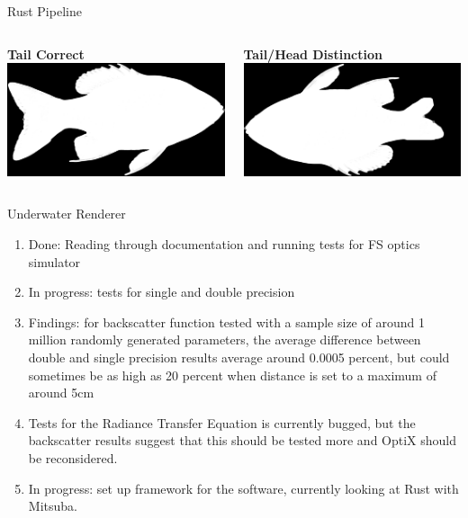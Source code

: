 \begin{frame}{Rust Pipeline}
    \begin{columns}[c]
          \centering
          \textbf{Tail Correct}\\[1ex]
          \includegraphics[height=0.48\textheight,keepaspectratio]{./images/picture1.png}
    
          \centering
          \textbf{Tail/Head Distinction}\\[1ex]
          \includegraphics[height=0.48\textheight,keepaspectratio]{./images/picture2.png}
    \end{columns}
\end{frame}

\begin{frame}{Underwater Renderer}
    \begin{enumerate}
	    \item Done: Reading through documentation and running tests for FS optics simulator
	    \item In progress: tests for single and double precision
     	    \item Findings: for backscatter function tested with a sample size of around 1 million randomly generated parameters, the average difference between double and single precision results average around 0.0005 percent, but could sometimes be as high as 20 percent when distance is set to a maximum of around 5cm
	    \item Tests for the Radiance Transfer Equation is currently bugged, but the backscatter results suggest that this should be tested more and OptiX should be reconsidered.
	    \item In progress: set up framework for the software, currently looking at Rust with Mitsuba.
    \end{enumerate}
\end{frame}

